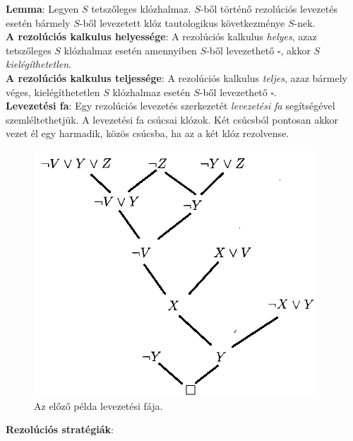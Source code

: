 \documentclass[margin=0px]{article}
\begin{document}
	\noindent \textbf{Lemma}: Legyen $S$ tetszőleges klózhalmaz. $S$-ből történő rezolúciós levezetés esetén bármely $S$-ből
	levezetett klóz tautologikus következménye $S$-nek.\\
	
	\noindent \textbf{A rezolúciós kalkulus helyessége}: A rezolúciós kalkulus \textit{helyes}, azaz tetszőleges
	$S$ klózhalmaz esetén amennyiben $S$-ből levezethető $\square$, akkor $S$ \textit{kielégíthetetlen}.\\
	 
	\noindent \textbf{A rezolúciós kalkulus teljessége}: A rezolúciós kalkulus \textit{teljes}, azaz bármely véges, kielégíthetetlen
	$S$ klózhalmaz esetén $S$-ből levezethető $\square$.\\	 
	 
	\noindent \textbf{Levezetési fa}: Egy rezolúciós levezetés szerkezetét \textit{levezetési fa} segítségével szemléltethetjük.
	A levezetési fa csúcsai klózok. Két csúcsból pontosan akkor vezet él egy harmadik, közös csúcsba, ha az a két klóz rezolvense.
	
	\begin{figure}[H]
		\centering
		\includegraphics[width=0.5\linewidth]{img/rezoluciopelda_levfa}
		\caption{Az előző példa levezetési fája.}
		\label{fig:rezoluciopelda_levfa}
	\end{figure}
	
	\noindent \textbf{Rezolúciós stratégiák}:
	
\end{document}
